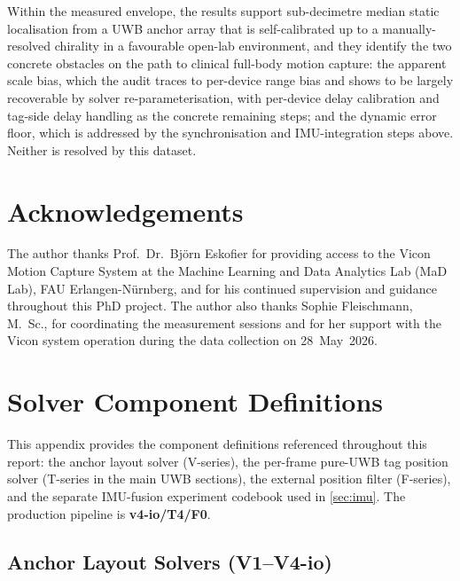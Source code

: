 \documentclass[11pt,a4paper]{article}
\begin{document}
Within the measured envelope, the results support sub-decimetre median
static localisation from a UWB anchor array that is self-calibrated up to
a manually-resolved chirality in a
favourable open-lab environment, and they identify the two concrete
obstacles on the path to clinical full-body motion capture: the apparent
scale bias, which the audit traces to per-device range bias and shows to
be largely recoverable by solver re-parameterisation, with per-device
delay calibration and tag-side delay handling as the concrete remaining
steps; and the dynamic error floor, which is addressed by the
synchronisation and IMU-integration steps above.
Neither is resolved by this dataset.

\section*{Acknowledgements}

The author thanks Prof.\ Dr.\ Björn Eskofier for providing access to the Vicon Motion Capture System at the Machine Learning and Data Analytics Lab (MaD Lab), FAU Erlangen-Nürnberg, and for his continued supervision and guidance throughout this PhD project.
The author also thanks Sophie Fleischmann, M.~Sc., for coordinating the measurement sessions and for her support with the Vicon system operation during the data collection on 28~May~2026.




\appendix

\section{Solver Component Definitions}
\label{app:solvers}

This appendix provides the component definitions referenced throughout this report:
the anchor layout solver (V-series), the per-frame pure-UWB tag position solver (T-series in the main UWB sections), the external position filter (F-series), and the separate IMU-fusion experiment codebook used in \cref{sec:imu}.
The production pipeline is \textbf{v4-io/T4/F0}.

\subsection{Anchor Layout Solvers (V1--V4-io)}
\label{app:layout}
\end{document}

